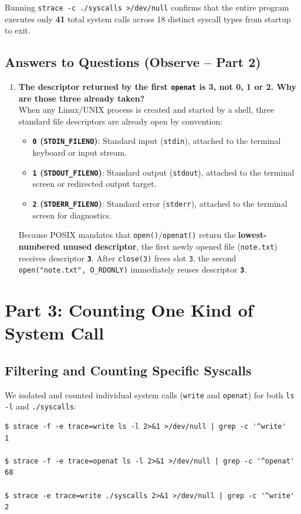\documentclass[12pt,a4paper]{article}
\begin{document}
Running \texttt{strace -c ./syscalls >/dev/null} confirms that the entire program executes only \textbf{41} total system calls across 18 distinct syscall types from startup to exit.

\subsection{Answers to Questions (Observe -- Part 2)}
\begin{enumerate}
    \item \textbf{The descriptor returned by the first \texttt{openat} is 3, not 0, 1 or 2. Why are those three already taken?} \\
    When any Linux/UNIX process is created and started by a shell, three standard file descriptors are already open by convention:
    \begin{itemize}
        \item \textbf{\texttt{0} (\texttt{STDIN\_FILENO})}: Standard input (\texttt{stdin}), attached to the terminal keyboard or input stream.
        \item \textbf{\texttt{1} (\texttt{STDOUT\_FILENO})}: Standard output (\texttt{stdout}), attached to the terminal screen or redirected output target.
        \item \textbf{\texttt{2} (\texttt{STDERR\_FILENO})}: Standard error (\texttt{stderr}), attached to the terminal screen for diagnostics.
    \end{itemize}
    Because POSIX mandates that \texttt{open()}/\texttt{openat()} return the \textbf{lowest-numbered unused descriptor}, the first newly opened file (\texttt{note.txt}) receives descriptor \textbf{\texttt{3}}. After \texttt{close(3)} frees slot \texttt{3}, the second \texttt{open("note.txt", O\_RDONLY)} immediately reuses descriptor \textbf{\texttt{3}}.
\end{enumerate}

\section{Part 3: Counting One Kind of System Call}

\subsection{Filtering and Counting Specific Syscalls}
We isolated and counted individual system calls (\texttt{write} and \texttt{openat}) for both \texttt{ls -l} and \texttt{./syscalls}:
\begin{lstlisting}[style=consolestyle]
$ strace -f -e trace=write ls -l 2>&1 >/dev/null | grep -c '^write'
1

$ strace -f -e trace=openat ls -l 2>&1 >/dev/null | grep -c '^openat'
68

$ strace -e trace=write ./syscalls 2>&1 >/dev/null | grep -c '^write'
2
\end{lstlisting}
\end{document}
